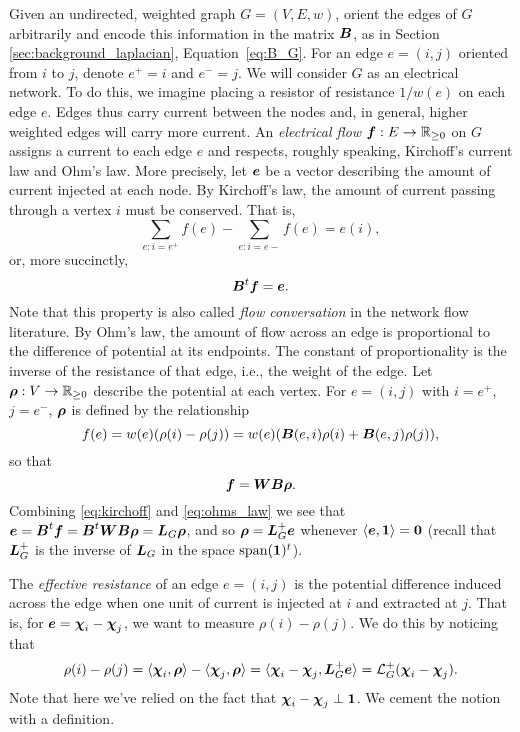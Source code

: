 Given an undirected, weighted graph $G=(V,E,w)$, orient the edges of $G$ arbitrarily and encode this information in the matrix $\vb*{B}$, as in Section \ref{sec:background_laplacian}, Equation~\eqref{eq:B_G}. For an edge $e=(i,j)$ oriented from $i$ to $j$, denote $e^+=i$ and $e^-=j$. 
We will consider $G$ as an electrical network. To do this, we imagine placing a resistor of resistance $1/w(e)$ on each edge $e$. Edges thus carry current between the nodes and, in general, higher weighted edges will carry more current.  
An \emph{electrical flow $\vb*{f}:E\to\mathbb{R}_{\geq 0}$} on $G$ assigns a current to each edge $e$ and respects, roughly speaking, Kirchoff's current law and Ohm's law. More precisely, let $\vb*{e}$ be a vector describing the amount of current injected at each node. By Kirchoff's law, the amount of current passing through a vertex $i$ must be conserved. That is, 
\[\sum_{e:i=e^+}f(e) - \sum_{e:i=e-}f(e) = e(i),\]
or, more succinctly, 
\begin{equation}
\label{eq:kirchoff}
\vb*{B}^t \vb*{f}=\vb*{e}. 
\end{equation}
Note that this property is also called \emph{flow conversation} in the network flow literature. 
By Ohm's law, the amount of flow across an edge is proportional to the difference of potential at its endpoints. The constant of proportionality is the inverse of the resistance of that edge, i.e., the weight of the edge. Let $\vb*{\rho}:V\to\mathbb{R}_{\geq 0}$ describe the potential at each vertex. For $e=(i,j)$ with $i=e^+$, $j=e^-$, $\vb*{\rho}$ is defined by the relationship 
\begin{equation*}
f(e) = w(e)(\rho(i)-\rho(j)) = w(e) (\vb*{B}(e,i)\rho(i) + \vb*{B}(e,j)\rho(j)),
\end{equation*}
so that
\begin{equation}
\label{eq:ohms_law}
\vb*{f}=\vb*{W}\vb*{B}\vb*{\rho}.
\end{equation}
Combining \eqref{eq:kirchoff} and \eqref{eq:ohms_law} we see that $\vb*{e}=\vb*{B}^t \vb*{f}=\vb*{B}^t \vb*{W}\vb*{B} \vb*{\rho} = \vb*{L}_G\vb*{\rho}$, and so $\vb*{\rho} = \vb*{L}_G^+\vb*{e}$ whenever $\langle \vb*{e},\vb{1}\rangle=\vb{0}$ (recall that $\vb*{L}_G^+$ is the inverse of $\vb*{L}_G$ in the space $\textnormal{span}(\vb{1})^t$).  

The \emph{effective resistance} of an edge $e=(i,j)$ is the potential difference induced across the edge when one unit of current is injected at $i$ and extracted at $j$. That is, for $\vb*{e}=\boldsymbol{\chi}_i-\boldsymbol{\chi}_j$, we want to measure $\rho(i)-\rho(j)$. We do this by noticing that 
\[\rho(i)-\rho(j) = \langle \boldsymbol{\chi}_i,\vb*{\rho}\rangle - \langle \boldsymbol{\chi}_j,\vb*{\rho}\rangle = \langle \boldsymbol{\chi}_i-\boldsymbol{\chi}_j,\vb*{L}_G^+\vb*{e}\rangle=\mathcal{L}_G^+(\boldsymbol{\chi}_i-\boldsymbol{\chi}_j).\]
Note that here we've relied on the fact that $\boldsymbol{\chi}_i-\boldsymbol{\chi}_j\perp \vb{1}$. We cement the notion with a definition. 












